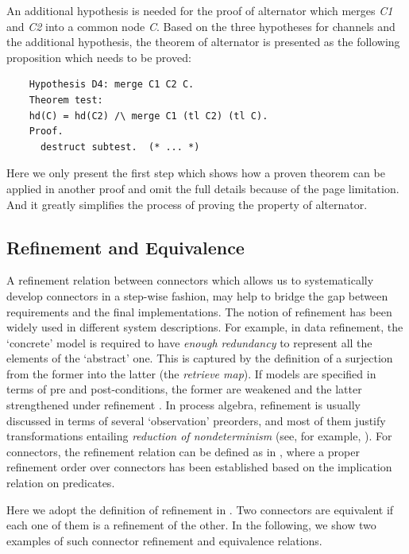 \documentclass{llncs}
\begin{document}
\begin{example}
An additional hypothesis is needed for the proof of alternator which merges \emph{C1} and \emph{C2} into a common node \emph{C}. Based on the three
hypotheses for channels and the additional hypothesis, the theorem of alternator is presented as the following proposition which needs to be proved:
\begin{verbatim}
    Hypothesis D4: merge C1 C2 C.
    Theorem test:
    hd(C) = hd(C2) /\ merge C1 (tl C2) (tl C).
    Proof.
      destruct subtest.  (* ... *)
\end{verbatim}
Here we only present the first step which shows how a proven theorem can be applied in another proof and omit the full details because of the page limitation.
And it greatly simplifies the process of proving the property of alternator.
\end{example}

\subsection{Refinement and Equivalence}

A refinement relation between connectors which allows us to systematically develop connectors in a step-wise fashion, may help to bridge
the gap between requirements and the final implementations. The notion of refinement has been widely used in different system descriptions.
For example, in data refinement\cite{RE98}, the `concrete' model is required to have \emph{enough redundancy} to represent all the elements
of the `abstract' one. This is captured by the definition of a surjection from the former into the latter (the \emph{retrieve map}). If
models are specified in terms of pre and post-conditions, the former are weakened and the latter strengthened under refinement \cite{Jon90}.
In process algebra, refinement is usually discussed in terms of several `observation' preorders, and most of them justify
transformations entailing \emph{reduction of nondeterminism} (see, for
example, \cite{Ros98}). For connectors, the refinement relation can be
defined as in \cite{SAA+12}, where a proper refinement order over
connectors has been established based on the implication relation on 
predicates.

Here we adopt the definition of refinement in \cite{SAA+12}. Two connectors are equivalent if each one of them is a refinement of the other.
In the following, we show two examples of such connector refinement and equivalence relations.
\end{document}
